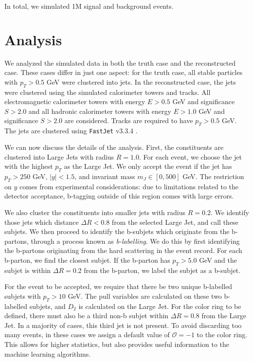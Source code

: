 \documentclass[10pt,a4paper]{book}
\def\code#1{\texttt{#1}}
\begin{document}
In total, we simulated 1M signal and background events.


\section{Analysis}

We analyzed the simulated data in both the truth case and the reconstructed case. These cases differ in just one aspect: for the truth case, all stable particles with $p_T > 0.5$ GeV were clustered into jets. In the reconstructed case, the jets were clustered using the simulated calorimeter towers and tracks. All electromagnetic calorimeter towers with energy $E > 0.5$ GeV and significance $S > 2.0$ and all hadronic calorimeter towers with energy $E > 1.0$ GeV and significance $S > 2.0$ are considered. Tracks are required to have $p_T > 0.5$ GeV. The jets are clustered using \code{FastJet} v3.3.4 \cite{Cacciari:2011ma}.

We can now discuss the details of the analysis. First, the constituents are clustered into Large Jets with radius $R=1.0$.  For  each  event,  we  choose  the jet with the highest $p_T$ as the Large Jet. We only accept the event if the jet has $p_T > 250$ GeV, $\vert y \vert < 1.5$, and invariant mass $m_J \in [0,500]$ GeV. The restriction on $y$ comes from experimental considerations: due to limitations related to the detector acceptance, b-tagging outside of this region comes with large errors. 

We  also  cluster  the  constituents  into  smaller  jets with radius $R = 0.2$. We identify those jets which distance $\Delta R < 0.8$ from the selected Large Jet, and call these subjets. We then proceed to identify the b-subjets which originate from the b-partons, through a process known as \emph{b-labelling}. We do this by first identifying the b-partons originating from the hard scattering in the event record. For each b-parton, we find the closest subjet. If the b-parton has $p_T > 5.0$ GeV and the subjet is within $\Delta R = 0.2$ from the b-parton, we label the subjet as a b-subjet. 

For the event to be accepted, we require that there be two unique b-labelled subjets with $p_T > 10$ GeV. The pull variables are calculated on these two b-labelled subjets, and $D_2$ is calculated on the Large Jet. For the color ring to be defined, there must also be a third non-b subjet within $\Delta R = 0.8$ from the Large Jet. In a majority of cases, this third jet is not present. To avoid discarding too many events, in these cases we assign a default value of $\mathcal{O} = -1$ to the color ring. This allows for higher statistics, but also provides useful information to the machine learning algorithms.
\end{document}
